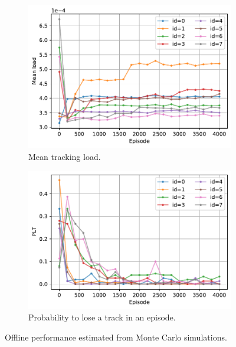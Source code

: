 \documentclass[english, 12pt, a4paper, elec, utf8, a-1b, online]{aaltothesis}
\begin{document}
\begin{figure}
    \centering
    \begin{subfigure}[b]{0.8\textwidth}
        \includegraphics[width=\textwidth]{figures/benchmark/Training/offline_load.pdf}
        \caption{Mean tracking load.}
        \label{fig:offline_load}
    \end{subfigure}
    \hfill
    \begin{subfigure}[b]{0.8\textwidth}
        \includegraphics[width=\textwidth]{figures/benchmark/Training/offline_plt.pdf}
        \caption{Probability to lose a track in an episode.}
        \label{fig:offline_lost}
    \end{subfigure}
    \caption{
        Offline performance estimated from Monte Carlo simulations.
    }
    \label{fig:offline_performance}
\end{figure}
\end{document}
